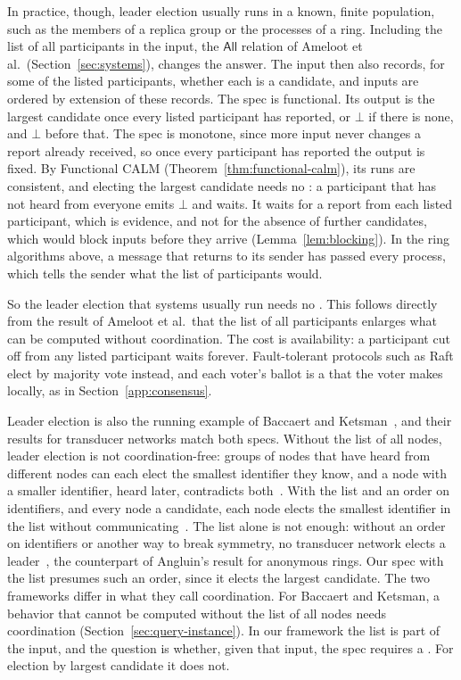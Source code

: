 In practice, though, leader election usually runs in a known, finite
population, such as the members of a replica group or the processes of a
ring.  Including the list of all participants in the input, the
$\mathsf{All}$ relation of Ameloot et al.\ (Section~\ref{sec:systems}),
changes the answer.  The input then also records, for some of the listed
participants, whether each is a candidate, and inputs are ordered by extension
of these records.  The spec is functional.  Its output is the largest
candidate once every listed participant has reported, or $\bot$ if there is
none, and $\bot$ before that.  The spec is monotone, since more input never
changes a report already received, so once every participant has reported the
output is fixed.  By Functional CALM (Theorem~\ref{thm:functional-calm}), its
runs are consistent, and electing the largest candidate needs no
\commitment: a participant that has not heard from everyone emits $\bot$ and
waits.  It waits for a report from each listed participant, which is
evidence, and not for the absence of further candidates, which would block
inputs before they arrive (Lemma~\ref{lem:blocking}).  In the ring algorithms
above, a message that returns to its sender has passed every process, which
tells the sender what the list of participants would.

So the leader election that systems usually run needs no \commitment.  This
follows directly from the result of Ameloot et al.\ that the list of all
participants enlarges what can be computed without coordination.  The cost is
availability: a participant cut off from any listed participant waits
forever.  Fault-tolerant protocols such as Raft elect by majority vote instead,
and each voter's ballot is a \commitment that the voter makes locally, as in
Section~\ref{app:consensus}.

Leader election is also the running example of Baccaert and
Ketsman~\cite{baccaert2026spectrum}, and their results for transducer networks
match both specs.  Without the list of all nodes, leader election is not
coordination-free: groups of nodes that have heard from different nodes can
each elect the smallest identifier they know, and a node with a smaller
identifier, heard later, contradicts both~\cite[Prop.~37]{baccaert2026spectrum}.
With the list and an order on identifiers, and every node a candidate, each
node elects the smallest identifier in the list without
communicating~\cite[Ex.~6]{baccaert2026spectrum}.  The list alone is not
enough: without an order on identifiers or another way to break symmetry, no
transducer network elects a leader~\cite[Thm.~1]{baccaert2026spectrum}, the
counterpart of Angluin's result for anonymous rings.  Our spec with the list
presumes such an order, since it elects the largest candidate.  The two
frameworks differ in what they call coordination.  For Baccaert and Ketsman, a
behavior that cannot be computed without the list of all nodes needs
coordination (Section~\ref{sec:query-instance}).  In our framework the list is
part of the input, and the question is whether, given that input, the spec
requires a \commitment.  For election by largest candidate it does not.

